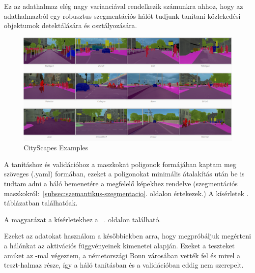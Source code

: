 \documentclass[12pt,oneside,a4paper]{article}
\theoremstyle{remark}
\begin{document}
    Ez az adathalmaz elég nagy varianciával rendelkezik számunkra ahhoz, hogy az adathalmazból egy
    robusztus szegmentációs hálót tudjunk tanítani közlekedési objektumok detektálására és osztályozására.


    \begin{figure}[ht]
       \centering
        \noindent\includegraphics[width=1\linewidth]{cityscapes}
        \caption{CityScapes Examples}
        \label{fig:CityScapes-Examples}
    \end{figure}
    A tanításhoz és validációhoz a maszkokat poligonok formájában kaptam meg szöveges (.yaml) formában, ezeket a poligonokat
    minimális átalakítás után be is tudtam adni a háló bemenetére a megfelelő képekhez rendelve (szegmentációs
    maszkokról:~\ref{subsec:szemantikus-szegmentacio}. oldalon értekezek.)
    A kísérletek . táblázatban találhatóak.

    A magyarázat a kísérletekhez a ~\pageref{subsec:magyarazat}\label{pageref}.
    oldalon található.

    Ezeket az adatokat használom a későbbiekben arra, hogy megpróbáljuk megérteni a hálónkat az aktivációs függvényeinek kimenetei
    alapján.
    Ezeket a teszteket amiket az -mal végeztem, a németországi Bonn városában
    vették fel és mivel a teszt-halmaz része, így a háló tanításban és a validációban eddig nem szerepelt.
\end{document}
